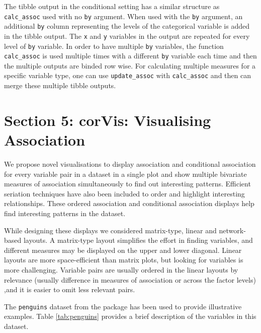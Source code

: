 The tibble output in the conditional setting has a similar structure as
\texttt{calc\_assoc} used with no \texttt{by} argument. When used with
the \texttt{by} argument, an additional \texttt{by} column representing
the levels of the categorical variable is added in the tibble output.
The \texttt{x} and \texttt{y} variables in the output are repeated for
every level of \texttt{by} variable. In order to have multiple
\texttt{by} variables, the function \texttt{calc\_assoc} is used
multiple times with a different \texttt{by} variable each time and then
the multiple outputs are binded row wise. For calculating multiple
measures for a specific variable type, one can use
\texttt{update\_assoc} with \texttt{calc\_assoc} and then can merge
these multiple tibble outputs.

\hypertarget{section-5-corvis-visualising-association}{%
\section{Section 5: corVis: Visualising
Association}\label{section-5-corvis-visualising-association}}

We propose novel visualisations to display association and conditional
association for every variable pair in a dataset in a single plot and
show multiple bivariate measures of association simultaneously to find
out interesting patterns. Efficient seriation techniques have also been
included to order and highlight interesting relationships. These ordered
association and conditional association displays help find interesting
patterns in the dataset.

While designing these displays we considered matrix-type, linear and
network-based layouts. A matrix-type layout simplifies the effort in
finding variables, and different measures may be displayed on the upper
and lower diagonal. Linear layouts are more space-efficient than matrix
plots, but looking for variables is more challenging. Variable pairs are
usually ordered in the linear layouts by relevance (usually difference
in measures of association or across the factor levels) ,and it is
easier to omit less relevant pairs.

The \texttt{penguins} dataset from the  package
has been used to provide illustrative examples. Table \ref{tab:penguins}
provides a brief description of the variables in this dataset.


